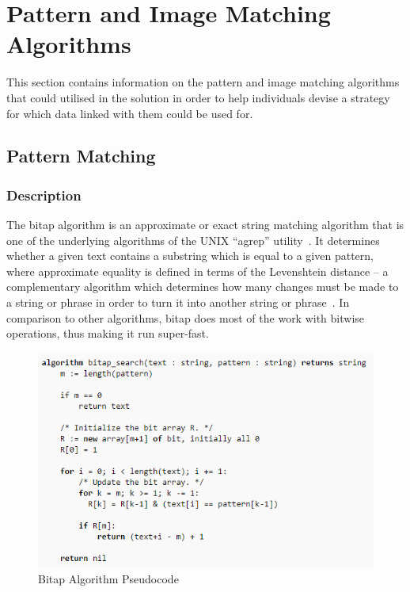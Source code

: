 \section{Pattern and Image Matching Algorithms}

  This section contains information on the pattern and image matching algorithms that could utilised in the solution in order to help individuals devise a strategy for which data linked with them could be used for.

  \subsection{Pattern Matching}

    \subsubsection{Description}

      The bitap algorithm is an approximate or exact string matching algorithm that is one of the underlying algorithms of the UNIX ``agrep'' utility~\cite{}. It determines whether a given text contains a substring which is equal to a given pattern, where approximate equality is defined in terms of the Levenshtein distance – a complementary algorithm which determines how many changes must be made to a string or phrase in order to turn it into another string or phrase~\cite{}. In comparison to other algorithms, bitap does most of the work with bitwise operations, thus making it run super-fast.

      \begin{figure}
        \centering
        \begin{minipage}{14cm}
          \centering
          \includegraphics[width=14cm]{inc/bitap_algorithm.png}
          \caption{Bitap Algorithm Pseudocode}
          \label{fig:bitap_algorithm_pseudocode}
        \end{minipage}
      \end{figure}

